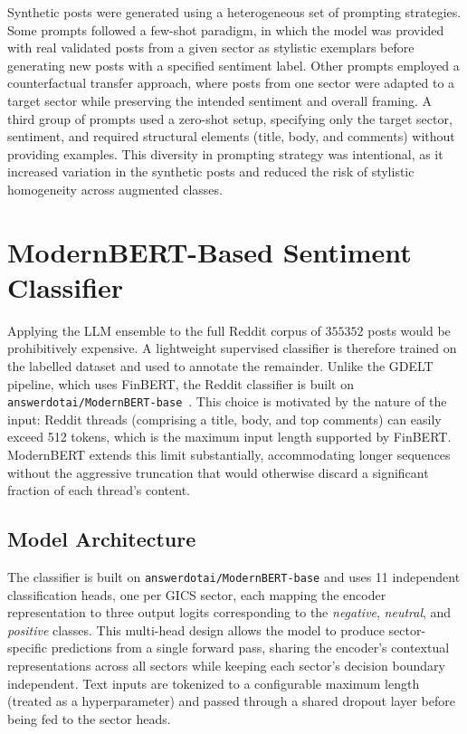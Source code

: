 Synthetic posts were generated using a heterogeneous set of prompting strategies. Some prompts followed a few-shot paradigm, in which the model was provided with real validated posts from a given sector as stylistic exemplars before generating new posts with a specified sentiment label. Other prompts employed a counterfactual transfer approach, where posts from one sector were adapted to a target sector while preserving the intended sentiment and overall framing. A third group of prompts used a zero-shot setup, specifying only the target sector, sentiment, and required structural elements (title, body, and comments) without providing examples. This diversity in prompting strategy was intentional, as it increased variation in the synthetic posts and reduced the risk of stylistic homogeneity across augmented classes.

\section{ModernBERT-Based Sentiment Classifier}
\label{sec:modernbert_sentiment_classifier}

Applying the LLM ensemble to the full Reddit corpus of $\num{355352}$ posts would be prohibitively expensive. A lightweight supervised classifier is therefore trained on the labelled dataset and used to annotate the remainder. Unlike the GDELT pipeline, which uses FinBERT, the Reddit classifier is built on \texttt{answerdotai/ModernBERT-base}~\cite{modernbert}. This choice is motivated by the nature of the input: Reddit threads (comprising a title, body, and top comments) can easily exceed 512 tokens, which is the maximum input length supported by FinBERT. ModernBERT extends this limit substantially, accommodating longer sequences without the aggressive truncation that would otherwise discard a significant fraction of each thread's content.

\subsection{Model Architecture}
\label{sec:redditarchitecture}

The classifier is built on \texttt{answerdotai/ModernBERT-base} and uses 11 independent classification heads, one per GICS sector, each mapping the encoder representation to three output logits corresponding to the \textit{negative}, \textit{neutral}, and \textit{positive} classes. This multi-head design allows the model to produce sector-specific predictions from a single forward pass, sharing the encoder's contextual representations across all sectors while keeping each sector's decision boundary independent. Text inputs are tokenized to a configurable maximum length (treated as a hyperparameter) and passed through a shared dropout layer before being fed to the sector heads.

